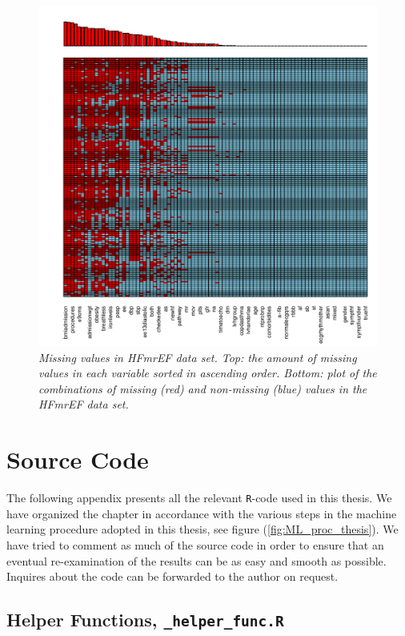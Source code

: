 \documentclass[../thesis.tex]{subfiles}
\begin{document}
\begin{figure}[h!]
    \centering
    \hspace*{-1cm}\includegraphics[width=1.1\textwidth]{doc/thesis/images/HFmrEF_miss_dist.pdf}
    \caption[Missing values in HFmrEF data set]{\textit{Missing values in HFmrEF data set. Top:  the amount of missing values in each variable sorted in ascending order. Bottom: plot of the combinations of missing (red) and non-missing (blue) values in the HFmrEF data set.}}
    \label{fig:HFmrEF_missing}
\end{figure}

\chapter{Source Code}
\label{chap:souce_code}

\noindent The following appendix presents all the relevant \texttt{R}-code used in this thesis. We have organized the chapter in accordance with the various steps in the machine learning procedure adopted in this thesis, see figure (\ref{fig:ML_proc_thesis}). We have tried to comment as much of the source code in order to ensure that an eventual re-examination of the results can be as easy and smooth as possible. Inquires about the code can be forwarded to the author on request.

\section{Helper Functions, \texttt{\_helper\_func.R}}
\label{sec:helper_func}
\end{document}
